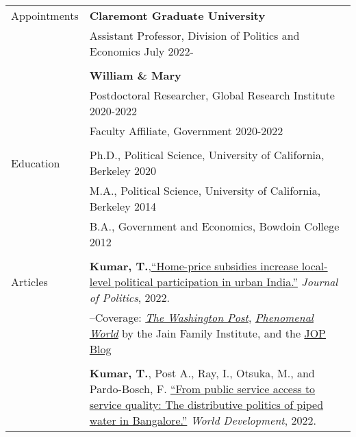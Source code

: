 \documentclass[letterpaper, 10pt]{article}
\begin{document}
\begin{longtable}{p{1in}p{5.5in}}

Appointments 
& \textbf{Claremont Graduate University} \hfill  \\
& Assistant Professor, Division of Politics and Economics \hfill July 2022-\\

& \\

& \textbf{William \& Mary} \hfill \\
& Postdoctoral Researcher, Global Research Institute \hfill 2020-2022 \\
& Faculty Affiliate, Government \hfill 2020-2022 \\

& \\



{Education} 
&Ph.D., Political Science, University of California, Berkeley \hfill 2020 \\


& M.A., Political Science, University of California, Berkeley \hfill 2014 \\
& B.A., Government and Economics, Bowdoin College  \hfill 2012 \\

& \\
\nohyphens{{Articles}} 



& \textbf{Kumar, T.},\href{https://doi.org/10.1086/715605}{``Home-price subsidies increase local-level political participation in urban India.''} \textit{Journal of Politics}, 2022.\\
& --\indent Coverage: \href{https://www.washingtonpost.com/news/monkey-cage/wp/2019/01/31/heres-what-gavin-newsom-elizabeth-warren-and-microsoft-should-know-if-want-to-end-the-affordable-housing-crisis/?tid=sm_tw_cage}{\textit{The Washington Post}}, \href{https://www.phenomenalworld.org/sources/original-and-forgery/}{\textit{Phenomenal World}} by the Jain Family Institute, and the \href{https://jop.blogs.uni-hamburg.de/home-price-subsidies-increase-local-level-political-participation-in-urban-india/}{JOP Blog}  \\
& \\



& \textbf{Kumar, T.}, Post A., Ray, I., Otsuka, M., and Pardo-Bosch, F. \href{https://doi.org/10.1016/j.worlddev.2021.105736}{``From public service access to service quality: The distributive politics of piped water in Bangalore.''} \textit{World Development}, 2022. \\


\end{longtable}
\end{document}
